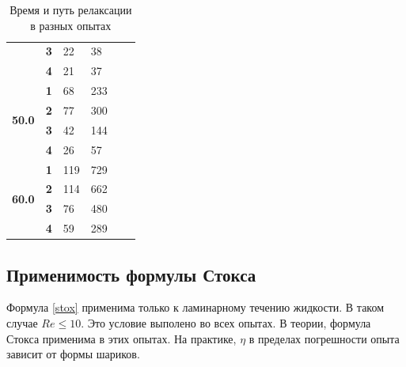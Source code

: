 \documentclass[a4paper]{article}
\begin{document}
\begin{table}[h]
\begin{tabular}{|l|l|l|l|ll}
                                              & \textbf{3}       & 22                                  & 38                                 &           &           \\ \cline{2-4}
                                              & \textbf{4}       & 21                                  & 37                                 &           &           \\ \cline{1-4}
\multirow{4}{*}{\textbf{50.0}}                & \textbf{1}       & 68                                  & 233                                &           &           \\ \cline{2-4}
                                              & \textbf{2}       & 77                                  & 300                                &           &           \\ \cline{2-4}
                                              & \textbf{3}       & 42                                  & 144                                &           &           \\ \cline{2-4}
                                              & \textbf{4}       & 26                                  & 57                                 &           &           \\ \cline{1-4}
\multirow{4}{*}{\textbf{60.0}}                & \textbf{1}       & 119                                 & 729                                &           &           \\ \cline{2-4}
                                              & \textbf{2}       & 114                                 & 662                                &           &           \\ \cline{2-4}
                                              & \textbf{3}       & 76                                  & 480                                &           &           \\ \cline{2-4}
                                              & \textbf{4}       & 59                                  & 289                                &           &           \\ \cline{1-4}
\end{tabular}
\caption{Время и путь релаксации в разных опытах}
\label{2}
\end{table}

\subsection{Применимость формулы Стокса}
Формула \ref{stox} применима только к ламинарному течению жидкости. В таком случае $Re \le 10$. Это условие выполено во всех опытах. В теории, формула Стокса применима в этих опытах. На практике, $\eta$ в пределах погрешности опыта зависит от формы шариков. 
\end{document}

